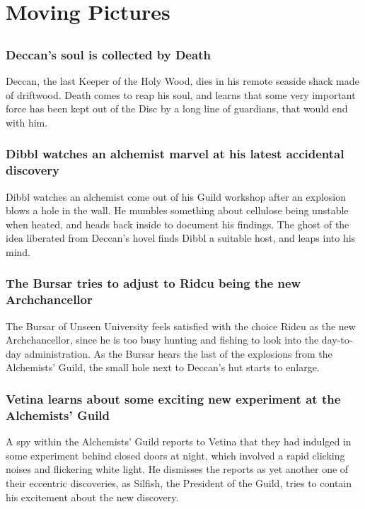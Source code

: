 \section{Moving Pictures}


\subsection{}
\subsubsection{\Gls{Deccan}'s soul is collected by \Gls{Death}}
\Gls{Deccan}, the last Keeper of the Holy Wood, dies in his remote seaside shack made of driftwood.
\Gls{Death} comes to reap his soul, and learns that some very important force has been kept out
of the Disc by a long line of guardians, that would end with him.

\subsubsection{\Gls{Dibbl} watches an alchemist marvel at his latest accidental discovery}
\Gls{Dibbl} watches an alchemist come out of his Guild workshop after an explosion blows a hole in
the wall. He mumbles something about cellulose being unstable when heated, and heads back inside to
document his findings. The ghost of the idea liberated from \Gls{Deccan}'s hovel finds \Gls{Dibbl}
a suitable host, and leaps into his mind.

\subsubsection{The \Gls{Bursar} tries to adjust to \Gls{Ridcu} being the new Archchancellor}
The \Gls{Bursar} of Unseen University feels satisfied with the choice \Gls{Ridcu} as the new
Archchancellor, since he is too busy hunting and fishing to look into the day-to-day administration.
As the \Gls{Bursar} hears the last of the explosions from the Alchemists' Guild, the small hole
next to \Gls{Deccan}'s hut starts to enlarge.

\subsubsection{\Gls{Vetina} learns about some exciting new experiment at the Alchemists' Guild}
A spy within the Alchemists' Guild reports to \Gls{Vetina} that they had indulged in some
experiment behind closed doors at night, which involved a rapid clicking noises and flickering
white light. He dismisses the reports as yet another one of their eccentric discoveries, as
\Gls{Silfish}, the President of the Guild, tries to contain his excitement about the new discovery.

